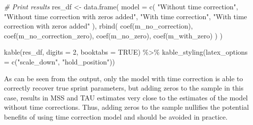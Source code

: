 \documentclass[fleqn,10pt,lineno]{wlpeerj} %
\newenvironment{Shaded}{\begin{snugshade}}{\end{snugshade}}
\newcommand{\AttributeTok}[1]{\textcolor[rgb]{0.77,0.63,0.00}{#1}}
\newcommand{\CommentTok}[1]{\textcolor[rgb]{0.56,0.35,0.01}{\textit{#1}}}
\newcommand{\ConstantTok}[1]{\textcolor[rgb]{0.00,0.00,0.00}{#1}}
\newcommand{\DecValTok}[1]{\textcolor[rgb]{0.00,0.00,0.81}{#1}}
\newcommand{\FunctionTok}[1]{\textcolor[rgb]{0.00,0.00,0.00}{#1}}
\newcommand{\NormalTok}[1]{#1}
\newcommand{\OtherTok}[1]{\textcolor[rgb]{0.56,0.35,0.01}{#1}}
\newcommand{\SpecialCharTok}[1]{\textcolor[rgb]{0.00,0.00,0.00}{#1}}
\newcommand{\StringTok}[1]{\textcolor[rgb]{0.31,0.60,0.02}{#1}}
\begin{document}
\begin{Shaded}
\begin{Highlighting}[]
\CommentTok{\# Print results}
\NormalTok{res\_df }\OtherTok{\textless{}{-}} \FunctionTok{data.frame}\NormalTok{(}
  \AttributeTok{model =} \FunctionTok{c}\NormalTok{(}
    \StringTok{"Without time correction"}\NormalTok{,}
    \StringTok{"Without time correction with zeros added"}\NormalTok{,}
    \StringTok{"With time correction"}\NormalTok{,}
    \StringTok{"With time correction with zeros added"}
\NormalTok{  ),}
  \FunctionTok{rbind}\NormalTok{(}
    \FunctionTok{coef}\NormalTok{(m\_no\_correction),}
    \FunctionTok{coef}\NormalTok{(m\_no\_correction\_zero),}
    \FunctionTok{coef}\NormalTok{(m\_no\_zero),}
    \FunctionTok{coef}\NormalTok{(m\_with\_zero)}
\NormalTok{  )}
\NormalTok{)}

\FunctionTok{kable}\NormalTok{(res\_df, }\AttributeTok{digits =} \DecValTok{2}\NormalTok{, }\AttributeTok{booktabs =} \ConstantTok{TRUE}\NormalTok{) }\SpecialCharTok{\%\textgreater{}\%}
  \FunctionTok{kable\_styling}\NormalTok{(}\AttributeTok{latex\_options =} \FunctionTok{c}\NormalTok{(}\StringTok{"scale\_down"}\NormalTok{, }\StringTok{"hold\_position"}\NormalTok{))}
\end{Highlighting}
\end{Shaded}

\begin{table}[!h]
\centering
{}
\end{table}

As can be seen from the output, only the model with time correction is able to correctly recover true sprint parameters, but adding zeros to the sample in this case, results in MSS and TAU estimates very close to the estimates of the model without time corrections. Thus, adding zeros to the sample nullifies the potential benefits of using time correction model and should be avoided in practice.
\end{document}
